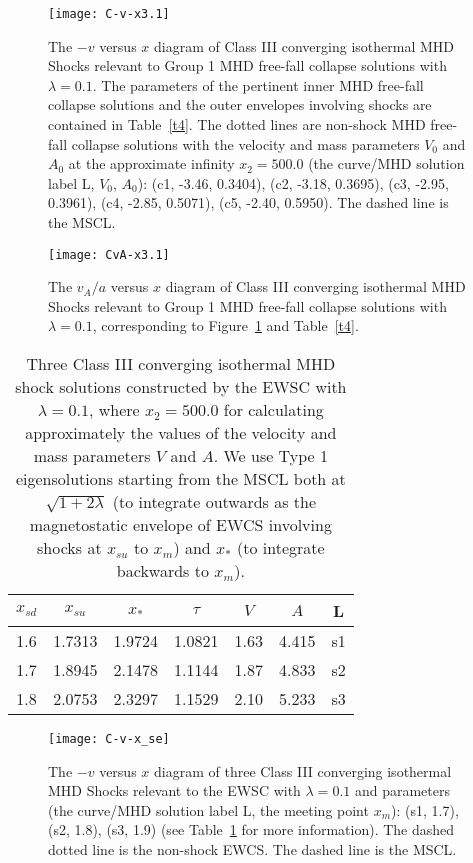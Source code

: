 \documentclass[fleqn,usenatbib]{mnras}
\begin{document}
\begin{figure}
\centering
\texttt{[image: C-v-x3.1]}
\caption{The $-v$ versus $x$ diagram of Class III converging isothermal MHD Shocks relevant to Group 1 MHD free-fall collapse solutions with $\lambda=0.1$. The parameters of the pertinent inner MHD free-fall collapse solutions and the outer envelopes involving shocks are contained in Table~\ref{t4}. The dotted lines are non-shock MHD free-fall collapse solutions with the velocity and mass parameters $V_{0}$ and $A_{0}$ at the approximate infinity $x_{2}=500.0$ (the curve/MHD solution label L, $V_{0}$, $A_{0}$): (c1, -3.46, 0.3404), (c2, -3.18, 0.3695), (c3, -2.95, 0.3961), (c4, -2.85, 0.5071), (c5, -2.40, 0.5950). The dashed line is the MSCL.}
\label{16}
\end{figure}

\begin{figure}
\centering
\texttt{[image: CvA-x3.1]}
\caption{The $v_{A}/a$ versus $x$ diagram of Class III converging isothermal MHD Shocks relevant to Group 1 MHD free-fall collapse solutions with $\lambda=0.1$, corresponding to Figure~\ref{16} and Table~\ref{t4}.}
\label{17}
\end{figure}

\begin{table}
\centering
\caption{Three Class III converging isothermal MHD shock solutions constructed by the EWSC with $\lambda=0.1$, where $x_{2}=500.0$ for calculating approximately the values of the velocity and mass parameters $V$ and $A$. We use Type 1 eigensolutions starting from the MSCL both at $\sqrt{1+2\lambda}$ (to integrate outwards as the magnetostatic envelope of EWCS involving shocks at $x_{su}$ to $x_{m}$) and $x_{*}$ (to integrate backwards to $x_{m}$).}
\begin{tabular}{ccccccc}
\hline
$x_{sd}$ & $x_{su}$ & $x_{*}$ & $\tau$ & $V$ & $A$ & L\\
\hline
1.6 & 1.7313 & 1.9724 & 1.0821 & 1.63 & 4.415 & s1 \\
1.7 & 1.8945 & 2.1478 & 1.1144 & 1.87 & 4.833 & s2 \\
1.8 & 2.0753 & 2.3297 & 1.1529 & 2.10 & 5.233 & s3 \\
\hline
\end{tabular}
\label{tse}
\end{table}


\begin{figure}
\centering
\texttt{[image: C-v-x\_se]}
\caption{The $-v$ versus $x$ diagram of three Class III converging isothermal MHD Shocks relevant to the EWSC with $\lambda=0.1$ and parameters (the curve/MHD solution label L, the meeting point $x_{m}$): (s1, 1.7), (s2, 1.8), (s3, 1.9) (see Table~\ref{tse} for more information). The dashed dotted line is the non-shock EWCS. The dashed line is the MSCL.}
\label{se}
\end{figure}
\end{document}
